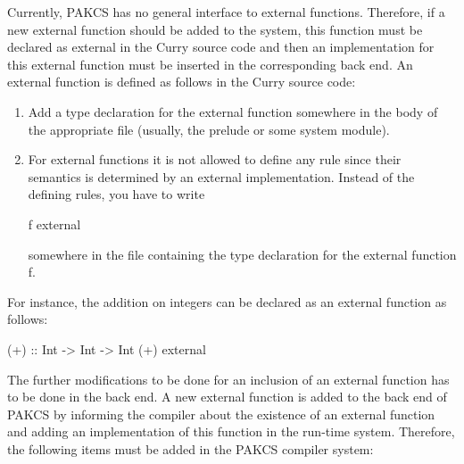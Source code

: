 \documentclass[11pt,fleqn]{article}
\renewcommand{\tt}{\usefont{OT1}{cmtt}{m}{n}\selectfont}
\newcommand{\codefont}{\tt}
\newcommand{\code}[1]{\mbox{\codefont #1}}
\begin{document}
Currently, PAKCS has no general interface to external functions.
Therefore, if a new external function should be added
to the system, this function must be declared as \code{external}
in the Curry source code
and then an implementation for this external function
must be inserted in the corresponding back end.
An external function is defined as follows in the Curry source code:
\begin{enumerate}
\item
Add a type declaration for the external function somewhere
in the body of the appropriate file (usually, the prelude
or some system module).
\item
For external functions it is not allowed to define any
rule since their semantics is determined by an external implementation.
Instead of the defining rules, you have to write
\begin{curry}
f external
\end{curry}
somewhere in the file containing the type declaration for 
the external function \code{f}.
\end{enumerate}
For instance, the addition on integers can be declared as
an external function as follows:
\begin{curry}
(+) :: Int -> Int -> Int
(+) external
\end{curry}
The further modifications to be done for an inclusion of
an external function has to be done in the back end.
A new external function is added to the back end of PAKCS
by informing the compiler about the existence of an external function
and adding an implementation of this function in the run-time
system. Therefore, the following items must be added
in the PAKCS compiler system:
\end{document}

